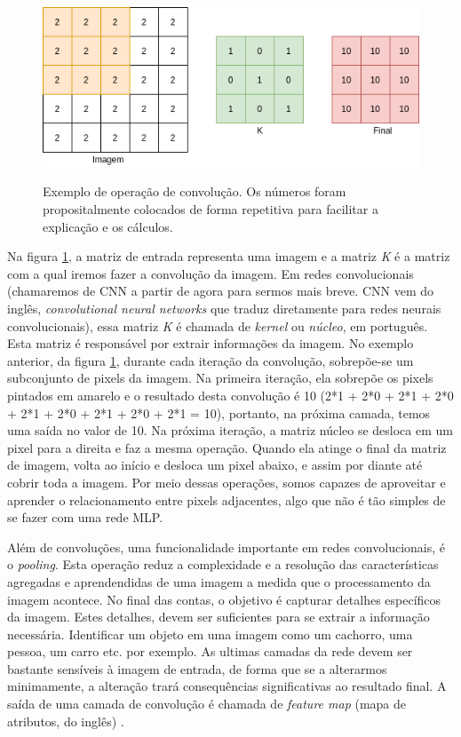 \begin{figure}[H]
    \centering
    \caption{Exemplo de operação de convolução. Os números foram propositalmente colocados de forma repetitiva para facilitar a explicação e os cálculos.}
    \includegraphics[width=12cm]{fig/conv.png}
    \label{fig:fig4}
\end{figure}

Na figura \ref{fig:fig4}, a matriz de entrada representa uma imagem e a matriz \textit{K} é a matriz com a qual iremos fazer a convolução da imagem. Em redes convolucionais (chamaremos de CNN a partir de agora para sermos mais breve. CNN vem do inglês, \textit{convolutional neural networks} que traduz diretamente para redes neurais convolucionais), essa matriz \textit{K} é chamada de \textit{kernel} ou \textit{núcleo}, em português. Esta matriz é responsável por extrair informações da imagem. No exemplo anterior, da figura \ref{fig:fig4}, durante cada iteração da convolução, sobrepõe-se um subconjunto de pixels da imagem. Na primeira iteração, ela sobrepõe os pixels pintados em amarelo e o resultado desta convolução é 10 (2*1 + 2*0 + 2*1 + 2*0 + 2*1 + 2*0 + 2*1 + 2*0 + 2*1 = 10), portanto, na próxima camada, temos uma saída no valor de 10. Na próxima iteração, a matriz núcleo se desloca em um pixel para a direita e faz a mesma operação. Quando ela atinge o final da matriz de imagem, volta ao início e desloca um pixel abaixo, e assim por diante até cobrir toda a imagem. Por meio dessas operações, somos capazes de aproveitar e aprender o relacionamento entre pixels adjacentes, algo que não é tão simples de se fazer com uma rede MLP.

Além de convoluções, uma funcionalidade importante em redes convolucionais, é o \textit{pooling}. Esta operação reduz a complexidade e a resolução das características agregadas e aprendendidas de uma imagem a medida que o processamento da imagem acontece. No final das contas, o objetivo é capturar detalhes específicos da imagem. Estes detalhes, devem ser suficientes para se extrair a informação necessária. Identificar um objeto em uma imagem como um cachorro, uma pessoa, um carro etc. por exemplo. As ultimas camadas da rede devem ser bastante sensíveis à imagem de entrada, de forma que se a alterarmos minimamente, a alteração trará consequências significativas ao resultado final. A saída de uma camada de convolução é chamada de \textit{feature map} (mapa de atributos, do inglês) \cite{zhang_dive_2021, brownlee_gentle_nodate}. 

